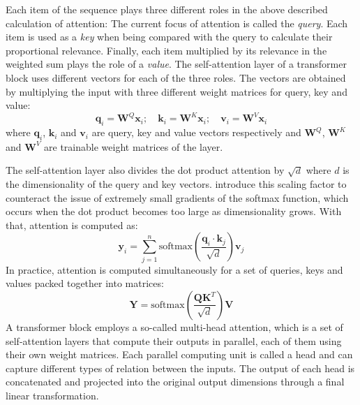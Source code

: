 Each item of the sequence plays three different roles
in the above described calculation of attention:
The current focus of attention is called the 
\textit{query}. Each item is used as
a \textit{key} when being compared with the
query to calculate their proportional relevance.
Finally, each item multiplied by its relevance in the
weighted sum plays the role of a \textit{value}.
The self-attention layer of a transformer block uses 
different vectors for each of the three roles. 
The vectors are obtained
by multiplying the input with three different weight 
matrices for query, key and value:
\begin{equation}
    \mathbf{q}_i = \mathbf{W}^Q\mathbf{x}_i;\quad \mathbf{k}_i = \mathbf{W}^K\mathbf{x}_i;\quad \mathbf{v}_i = \mathbf{W}^V\mathbf{x}_i
\end{equation} 
where $\mathbf{q}_i$, $\mathbf{k}_i$ and $\mathbf{v}_i$
are query, key and value vectors respectively and 
$\mathbf{W}^Q$, $\mathbf{W}^K$ and $\mathbf{W}^V$ 
are trainable weight matrices of the layer.

The self-attention layer also divides the dot product 
attention by $\sqrt{d}$ where $d$ is the dimensionality 
of the query and key vectors. \textcite{transformer}
introduce this scaling factor to counteract the issue
of extremely small gradients of the softmax function,
which occurs when 
the dot product becomes too large as dimensionality 
grows. With that, attention is computed as: 
\begin{equation}
    \mathbf{y}_i = \sum_{j=1}^n \textrm{softmax}\left(\frac{\mathbf{q}_i \cdot \mathbf{k}_j}{\sqrt{d}}\right) \mathbf{v}_j
\end{equation}
In practice, attention is computed simultaneously for
a set of queries, keys and values packed together
into matrices:
\begin{equation}
    \mathbf{Y} = \textrm{softmax}\left(\frac{\mathbf{QK}^T}{\sqrt{d}}\right)\mathbf{V}
\end{equation}
A transformer block employs a so-called multi-head
attention, which is a set of self-attention layers 
that compute their outputs in parallel, each of them using
their own weight matrices. Each parallel computing unit
is called a head and can capture different types of 
relation between the inputs. The output of each head is
concatenated and projected into the 
original output dimensions 
through a final linear transformation.

